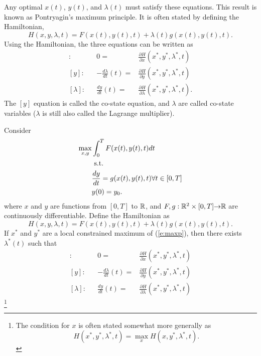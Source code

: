 Any optimal $x(t)$, $y(t)$, and $\lambda(t)$ must satisfy these
equations. This result is known as Pontryagin's maximum principle. It
is often stated by defining the Hamiltonian, 
\[ H(x,y,\lambda,t) = F(x(t),y(t),t) + \lambda(t) g(x(t),y(t),t). \]
Using the Hamiltonian, the three equations can be written as
\begin{align*}
  [x]: && 0 = & \frac{\partial H}{\partial x}(x^*,y^*,\lambda^*,t)
  \\
  [y]: && -\frac{d\lambda}{dt}(t) = & \frac{\partial H}{\partial y}(x^*,y^*,\lambda^*,t) \\
  [\lambda]: && \frac{dy}{dt}(t) = & \frac{\partial H}{\partial
    \lambda}(x^*,y^*,\lambda^*,t).
\end{align*}
The $[y]$ equation is called the co-state equation, and $\lambda$ are
called co-state variables ($\lambda$ is still also called the Lagrange
multiplier).
\begin{theorem}\label{thm:optcon}
  Consider 
  \begin{align}
    \max_{x,y} & \int_0^T F(x(t),y(t),t) dt \notag \\
    & \text{ s.t.} \\
    &  \frac{d y}{dt} = g(x(t),y(t),t) \forall t \in
    [0,T] \label{e:maxp} \\ 
    & y(0) = y_0. \notag
  \end{align}
  where $x$ and $y$ are functions from $[0,T]$ to $\mathbb{R}$, and $F,g:\mathbb{R}^2
  \times [0,T] {\rightarrow} \mathbb{R}$ are continuously differentiable. Define the
  Hamiltonian as
  \[ H(x,y,\lambda,t) = F(x(t),y(t),t) + \lambda(t) g(x(t),y(t),t). \]
  If $x^*$ and $y^*$ are a local constrained maximum of
  (\ref{e:maxp}), then there exists
  $\lambda^*(t)$ such that 
  \begin{align*}
    [x]: && 0 = & \frac{\partial H}{\partial x}(x^*,y^*,\lambda^*,t)
    \\
    [y]: && -\frac{d\lambda}{dt}(t) = & \frac{\partial H}{\partial y}(x^*,y^*,\lambda^*,t) \\
    [\lambda]: && \frac{dy}{dt}(t) = & \frac{\partial H}{\partial
      \lambda}(x^*,y^*,\lambda^*,t)
  \end{align*}\footnote{The condition for $x$ is often stated somewhat
    more generally as
    \[ H(x^*,y^*,\lambda^*,t) = \max_x H(x,y^*,\lambda^*,t). \]
  }
\end{theorem}

